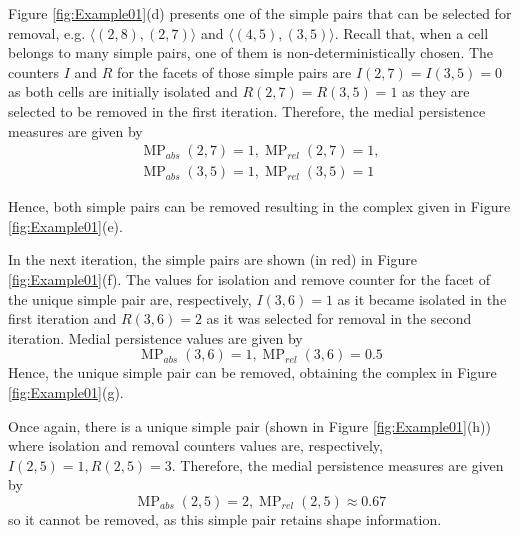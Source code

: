 \documentclass[journal]{IEEEtran}
\DeclareMathOperator{\MP}{MP}
\begin{document}
Figure \ref{fig:Example01}(d) presents one of the simple pairs that can be selected for removal,
e.g. $\langle (2,8), (2,7) \rangle$ and $\langle (4,5), (3,5) \rangle$. Recall that, when a cell
belongs to many simple pairs, one of them is non-deterministically chosen. The counters 
$I$ and $R$ for the facets of those simple pairs are $I(2,7)=I(3,5)=0$ as both cells are initially
isolated and $R(2,7)=R(3,5)=1$ as they are selected to be removed in the first iteration. Therefore,
the medial persistence measures are given by
\begin{eqnarray*}
\MP_{abs}(2,7)=1, \MP_{rel}(2,7)=1,\\
\MP_{abs}(3,5)=1, \MP_{rel}(3,5)=1
\end{eqnarray*}
 
Hence, both simple pairs can be removed resulting in the complex given in Figure \ref{fig:Example01}(e). 

In the next iteration, the simple pairs are shown (in red) in Figure \ref{fig:Example01}(f). 
The values for isolation and remove counter for the facet of the unique simple pair are, respectively,
$I(3,6)=1$ as it became isolated in the first iteration and $R(3,6)=2$ as it was selected for removal in
the second iteration. Medial persistence values are given by
$$
\MP_{abs}(3,6)=1, \MP_{rel}(3,6)=0.5
$$
Hence, the unique simple pair can be removed, obtaining the complex in Figure \ref{fig:Example01}(g).

Once again, there is a unique simple pair (shown in Figure \ref{fig:Example01}(h)) where 
isolation and removal counters values are, respectively, $I(2,5)=1, R(2,5)=3$. Therefore, 
the medial persistence measures are given by
$$
\MP_{abs}(2,5)=2, \MP_{rel}(2,5) \approx 0.67
$$
so it cannot be removed, as this simple pair retains shape information.
\end{document}

